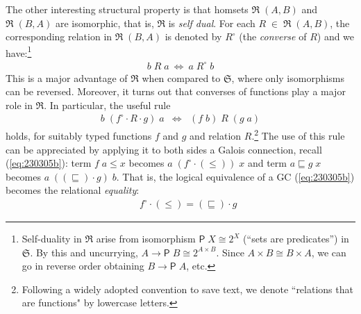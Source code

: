 \documentclass{elsarticle}
\newcommand{\Conid}[1]{\mathit{#1}}
\newcommand{\Varid}[1]{\mathit{#1}}
\renewcommand{\leq}{\leqslant}
\def\comp{ \mathbin{\cdot} }
\def\conv#1{#1^\circ}
\def\fun#1{\mathsf{#1}}
\def\cat#1{{\mathfrak #1}}
\def\start{&&}
\def\equiv{\Leftrightarrow}
\begin{document}
The other interesting structural property is
that homsets \ensuremath{\cat{R}\;(\Conid{A},\Conid{B})} and \ensuremath{\cat{R}\;(\Conid{B},\Conid{A})} are isomorphic, that is, \ensuremath{\cat{R}} is \emph{self dual}.
For each \ensuremath{\Conid{R}\;\mathbin\in \;\cat{R}\;(\Conid{A},\Conid{B})}, the corresponding relation in \ensuremath{\cat{R}\;(\Conid{B},\Conid{A})} is denoted by
\ensuremath{\conv{\Conid{R}}} (the \emph{converse} of \ensuremath{\Conid{R}}) and we have:\footnote{ Self-duality in \ensuremath{\cat{R}} arise from isomorphism \ensuremath{\fun P \;\Conid{X}\cong{\mathrm{2}}^{\Conid{X}}} (``sets are predicates'') in \ensuremath{\cat{S}}.  By this and uncurrying, \ensuremath{\Conid{A}\to \fun P \;\Conid{B}\cong{\mathrm{2}}^{\Conid{A} \times \Conid{B}}}.  Since \ensuremath{\Conid{A} \times \Conid{B}\cong\Conid{B} \times \Conid{A}}, we can go in reverse order obtaining \ensuremath{\Conid{B}\to \fun P \;\Conid{A}}, etc.}
\begin{eqnarray*}
\ensuremath{\Varid{b}\;\Conid{R}\;\Varid{a}~\Leftrightarrow~\Varid{a}\;\conv{\Conid{R}}\;\Varid{b}}
\end{eqnarray*}
This is a major advantage of \ensuremath{\cat{R}} when compared to \ensuremath{\cat{S}}, where only isomorphisms can be
reversed. Moreover, it turns out that converses of functions play a major role in \ensuremath{\cat{R}}.
In particular, the useful rule
\begin{eqnarray}
	\ensuremath{\Varid{b}\;(\conv{\Varid{f}} \comp \Conid{R} \comp \Varid{g})\;\Varid{a}}
&
\equiv
&
	\ensuremath{(\Varid{f}\;\Varid{b})\;\Conid{R}\;(\Varid{g}\;\Varid{a})}
	\label{eq:040120c} %
\end{eqnarray}
holds, for suitably typed functions \ensuremath{\Varid{f}} and \ensuremath{\Varid{g}} and relation \ensuremath{\Conid{R}}.\footnote{Following
a widely adopted convention \cite{BM97} to save text, we denote ``relations
that are functions" by lowercase letters.}
The use of this rule can be appreciated by applying it to both sides a Galois connection,
recall (\ref{eq:230305b}):
term \ensuremath{\Varid{f}\;\Varid{a}\leq \Varid{x}} becomes \ensuremath{\Varid{a}\;(\conv{\Varid{f}} \comp (\leq ))\;\Varid{x}} and
term \ensuremath{\Varid{a}\sqsubseteq \Varid{g}\;\Varid{x}} becomes \ensuremath{\Varid{a}\;((\sqsubseteq ) \comp \Varid{g})\;\Varid{b}}.
That is, the logical equivalence of a GC (\ref{eq:230305b}) becomes the relational \emph{equality}:
\begin{eqnarray}
\start	\ensuremath{\conv{\Varid{f}} \comp (\leq )\mathrel{=}(\sqsubseteq ) \comp \Varid{g}}
	\label{eq:040122b}
\end{eqnarray}
\end{document}
